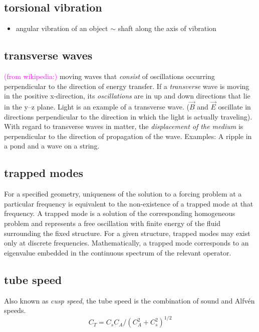 \documentclass{article}
\begin{document}
\subsection{torsional vibration}
\begin{itemize}
    \item angular vibration of an object $\sim$ shaft along the
        axis of vibration
\end{itemize}

\subsection{transverse waves}
\textcolor{magenta}{(from wikipedia:)}
moving waves that \emph{consist} of oscillations occurring perpendicular
to the direction of energy transfer.
If a \emph{transverse} wave is moving in the positive x-direction,
its \emph{oscillations} are in up and down directions that lie in the y–z plane.
Light is an example of a transverse wave.
($\vec{B}$ and $\vec{E}$ oscillate in directions perpendicular to the direction
in which the light is actually traveling).
With regard to transverse waves in matter,
the \emph{displacement of the medium} is perpendicular to the
direction of propagation of the wave.
Examples: A ripple in a pond and a wave on a string.

\subsection{trapped modes}
For a specified geometry, uniqueness of the solution to a forcing problem
at a particular frequency is equivalent to the non-existence of a trapped
mode at that frequency. A trapped mode is a solution of the corresponding
homogeneous problem and represents a free oscillation with finite energy
of the fluid surrounding the fixed structure. For a given structure,
trapped modes may exist only at discrete frequencies.
Mathematically, a trapped mode corresponds to an eigenvalue embedded
in the continuous spectrum of the relevant operator.

\subsection{tube speed}
Also known as \emph{cusp speed}, the tube speed is the combination of sound
and Alfv\'en speeds.
$${ C_{T} = C_{s}C_{A}/\left(C_{A}^{2} + C_{s}^{2}\right)^{1/2} }$$
\end{document}
